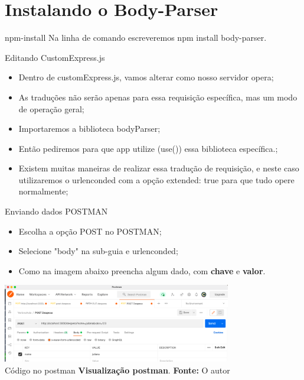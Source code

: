 \documentclass{beamer}
\begin{document}
 \section{Instalando o Body-Parser}
    \begin{frame}[label=lists]{npm-install}
    Na linha de comando escreveremos \alert{npm install body-parser}.\\
	\begin{exampleblock}{Editando CustomExpress.js}
		\begin{itemize}
			\item Dentro de customExpress.js, vamos alterar como nosso servidor opera;
			\item As traduções não serão apenas para essa requisição específica, mas um modo de operação geral;
			\item Importaremos a biblioteca bodyParser;
			\item Então pediremos para que app utilize (use()) essa biblioteca específica.;
			\item Existem muitas maneiras de realizar essa tradução de requisição, e neste caso utilizaremos o urlenconded com a opção extended: true para que tudo opere normalmente;
		\end{itemize}
	\end{exampleblock}
	     \end{frame}
    \begin{frame}[label=lists]{Enviando dados POSTMAN}
		\begin{itemize}
			\item Escolha a opção POST no POSTMAN;
			\item Selecione "body" na sub-guia e urlenconded;
			\item Como na imagem abaixo preencha algum dado, com \textbf{chave} e \textbf{valor}.
		\end{itemize}
		\begin{center}
    		\includegraphics[width=100mm]{resources/aula5_4.png}\\
	        \tiny{ Código no postman \textbf{Visualização postman}. \textbf{Fonte:} O autor}
	 \end{center}
	     \end{frame}
\end{document}
